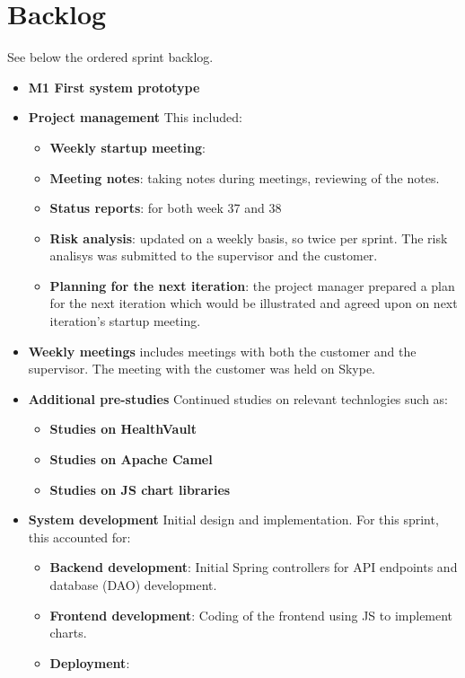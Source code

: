 \section{Backlog}

See below the ordered sprint backlog.
\begin{itemize}
	\item \textbf{M1 First system prototype}
	\item \textbf{Project management}\newline
	This included:
	\begin{itemize}
		\item \textbf{Weekly startup meeting}: 
		\item \textbf{Meeting notes}:
			taking notes during meetings, reviewing of the notes.
		\item \textbf{Status reports}:
			for both week 37 and 38
		\item \textbf{Risk analysis}:
			updated on a weekly basis, so twice per sprint.
			The risk analisys was submitted to the supervisor and the customer.
		\item \textbf{Planning for the next iteration}:
			the project manager prepared a plan for the next iteration
			which would be illustrated and agreed upon on next iteration's startup meeting.
	\end{itemize}
	\item \textbf{Weekly meetings}
		includes meetings with both the customer and the supervisor.
		The meeting with the customer was held on Skype.
	\item \textbf{Additional pre-studies}
		Continued studies on relevant technlogies such as:
	\begin{itemize}
		\item \textbf{Studies on HealthVault}
		\item \textbf{Studies on Apache Camel}
		\item \textbf{Studies on JS chart libraries}
	\end{itemize}
	\item \textbf{System development}
		Initial design and implementation. For this sprint, this accounted for:
	\begin{itemize}
		\item \textbf{Backend development}:
			Initial Spring controllers for API endpoints and database (DAO) development.
		\item \textbf{Frontend development}:
			Coding of the frontend using JS to implement charts.
		\item \textbf{Deployment}:

\end{itemize}
\end{itemize}
